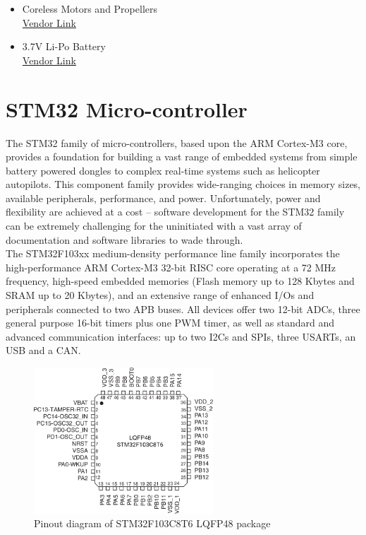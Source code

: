\documentclass[a4paper,12pt,oneside]{book}
\begin{document}
\begin{itemize}
\begin{itemize}
\item Coreless Motors and Propellers \\
\href{http://www.amazon.in/Engineerstoys-Coreless-Motor-Propeller-Set/dp/B01HTIN6CE/ref=sr_1_2?ie=UTF8&qid=1499068914&sr=8-2&keywords=coreless+motor}{Vendor Link}

\item 3.7V Li-Po Battery \\
\href{http://www.amazon.in/Generic-Cheerson-Quadcopter-Ariplane-shipping/dp/B071XYV3HR/ref=sr_1_8?ie=UTF8&qid=1499068765&sr=8-8&keywords=3.7v+lipo}{Vendor Link}

\end{itemize}
\end{itemize}

\section{STM32 Micro-controller}
The STM32 family of micro-controllers, based upon the ARM Cortex-M3 core, provides a foundation for building a vast range of embedded systems from simple battery powered dongles to complex real-time systems such as helicopter autopilots. This component family provides wide-ranging choices in memory sizes, available peripherals, performance, and power. Unfortunately, power and flexibility are achieved at a cost – software development for the STM32 family can be extremely challenging for the uninitiated with a vast array of documentation and software libraries to wade through.\cite{geob} \\

The STM32F103xx medium-density performance line family incorporates the high-performance ARM Cortex-M3 32-bit RISC core operating at a 72 MHz frequency, high-speed embedded memories (Flash memory up to 128 Kbytes and SRAM up to 20 Kbytes), and an extensive range of enhanced I/Os and peripherals connected to two APB buses. All devices offer two 12-bit ADCs, three general purpose 16-bit timers plus one PWM timer, as well as standard and advanced communication interfaces: up to two I2Cs and SPIs, three USARTs, an USB and a CAN.\cite{stm32}

\begin{figure}[!htb]
\centering
\includegraphics[width=0.6\textwidth]{images/stm32_pinout}
\caption{Pinout diagram of STM32F103C8T6 LQFP48 package}
\end{figure}
\end{document}
